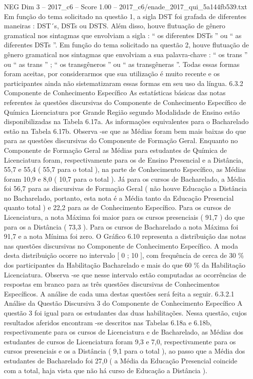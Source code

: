 \begin{textsample}{NEG Dim 3 – 2017\_c6 – Score 1.00 – 2017\_c6/enade\_2017\_qui\_5a144fb539.txt}
Em função do tema solicitado na questão 1, a sigla DST foi grafada de diferentes maneiras : DST´s, DSTs ou DSTS.
Além disso, houve flutuação de gênero gramatical nos sintagmas que envolviam a sigla : “ os diferentes DSTs ” ou “ as diferentes DSTs ”.
Em função do tema solicitado na questão 2, houve flutuação de gênero gramatical nos sintagmas que envolviam a sua palavra-chave : “ os trans ” ou “ as trans ” ; “ os transgêneros ” ou “ as transgêneras ”.
Todas essas formas foram aceitas, por considerarmos que sua utilização é muito recente e os participantes ainda não sistematizaram essas formas em seu uso da língua. 6.3.2 Componente de Conhecimento Específico As estatísticas básicas das notas referentes às questões discursivas do Componente de Conhecimento Específico de Química Licenciatura por Grande Região segundo Modalidade de Ensino estão disponibilizadas na Tabela 6.17a.
As informações equivalentes para o Bacharelado estão na Tabela 6.17b.
Observa -se que as Médias foram bem mais baixas do que para as questões discursivas do Componente de Formação Geral.
Enquanto no Componente de Formação Geral as Médias para estudantes de Química de Licenciatura foram, respectivamente para os de Ensino Presencial e a Distância, 55,7 e 55,4 ( 55,7 para o total ), na parte de Conhecimento Específico, as Médias foram 10,9 e 8,0 ( 10,7 para o total ).
Já para os cursos de Bacharelado, a Média foi 56,7 para as discursivas de Formação Geral ( não houve Educação a Distância no Bacharelado, portanto, esta nota é a Média tanto da Educação Presencial quanto total ) e 22,2 para as de Conhecimento Específico.
Para os cursos de Licenciatura, a nota Máxima foi maior para os cursos presenciais ( 91,7 ) do que para os a Distância ( 73,3 ).
Para os cursos de Bacharelado a nota Máxima foi 91,7 e a nota Mínima foi zero.
O Gráfico 6.10 representa a distribuição das notas nas questões discursivas no Componente de Conhecimento Específico.
A moda desta distribuição ocorre no intervalo [ 0 ; 10 ], com frequência de cerca de 30 \% dos participantes da Habilitação Bacharelado e mais do que 60 \% da Habilitação Licenciatura.
Observa -se que nesse intervalo estão computadas as ocorrências de respostas em branco para as três questões discursivas de Conhecimentos Específicos.
A análise de cada uma destas questões será feita a seguir. 6.3.2.1 Análise da Questão Discursiva 3 do Componente de Conhecimento Específico A questão 3 foi igual para os estudantes das duas habilitações.
Nessa questão, cujos resultados aferidos encontram -se descritos nas Tabelas 6.18a e 6.18b, respectivamente para os cursos de Licenciatura e de Bacharelado, as Médias dos estudantes de cursos de Licenciatura foram 9,3 e 7,0, respectivamente para os cursos presenciais e os a Distância ( 9,1 para o total ), ao passo que a Média dos estudantes de Bacharelado foi 27,0 ( a Média da Educação Presencial coincide com a total, haja vista que não há curso de Educação a Distância ).

\end{textsample}
